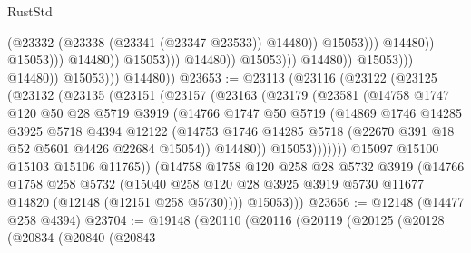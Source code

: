 \begin{lexlean}{RustStd}
\begin{coremodule}
                                                                (@23332
                                                                  (@23338
                                                                    (@23341 (@23347 @23533))
                                                                    @14480))
                                                                @15053)))
                                                          @14480))
                                                      @15053)))
                                                @14480))
                                            @15053)))
                                      @14480))
                                  @15053)))
                            @14480))
                        @15053)))
                  @14480))
              @15053)))
        @14480))
@23653 := @23113
    (@23116
      (@23122
        (@23125
          (@23132
            (@23135
              (@23151
                (@23157
                  (@23163
                    (@23179
                      (@23581
                        (@14758
                          @1747
                          @120
                          @50
                          @28
                          @5719
                          @3919
                          (@14766
                            @1747
                            @50
                            @5719
                            (@14869
                              @1746
                              @14285
                              @3925
                              @5718
                              @4394
                              @12122
                              (@14753
                                @1746
                                @14285
                                @5718
                                (@22670 @391 @18 @52 @5601 @4426 @22684 @15054))
                              @14480))
                          @15053)))))))
            @15097
            @15100
            @15103
            @15106
            @11765))
        (@14758
          @1758
          @120
          @258
          @28
          @5732
          @3919
          (@14766
            @1758
            @258
            @5732
            (@15040 @258 @120 @28 @3925 @3919 @5730 @11677 @14820 (@12148 (@12151 @258 @5730))))
          @15053)))
@23656 := @12148 (@14477 @258 @4394)
@23704 := @19148
    (@20110
      (@20116
        (@20119
          (@20125
            (@20128
              (@20834
                (@20840
                  (@20843

\end{coremodule}
\end{lexlean}
